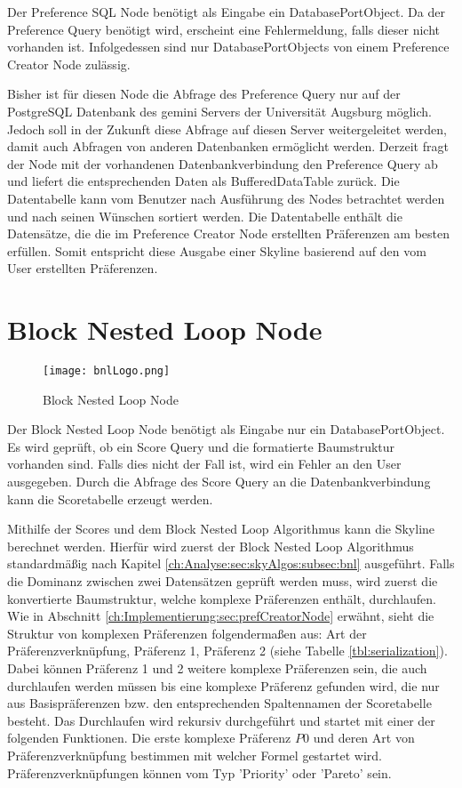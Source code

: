 Der Preference SQL Node benötigt als Eingabe ein DatabasePortObject. Da der Preference Query benötigt wird, erscheint eine Fehlermeldung, falls dieser nicht vorhanden ist. Infolgedessen sind nur DatabasePortObjects von einem Preference Creator Node zulässig.

Bisher ist für diesen Node die Abfrage des Preference Query nur auf der PostgreSQL Datenbank des gemini Servers der Universität Augsburg möglich. Jedoch soll in der Zukunft diese Abfrage auf diesen Server weitergeleitet werden, damit auch Abfragen von anderen Datenbanken ermöglicht werden.
Derzeit fragt der Node mit der vorhandenen Datenbankverbindung den Preference Query ab und liefert die entsprechenden Daten als BufferedDataTable zurück. Die Datentabelle kann vom Benutzer nach Ausführung des Nodes betrachtet werden und nach seinen Wünschen sortiert werden. Die Datentabelle enthält die Datensätze, die die im Preference Creator Node erstellten Präferenzen am besten erfüllen. Somit entspricht diese Ausgabe einer Skyline basierend auf den vom User erstellten Präferenzen.
\section{Block Nested Loop Node}
\label{ch:Implementierung:sec:bnlNode}
\begin{figure}[H]
	\centering
	\texttt{[image: bnlLogo.png]}
	\caption{Block Nested Loop Node}
	\label{img:bnlLogo}
\end{figure}

Der Block Nested Loop Node benötigt als Eingabe nur ein DatabasePortObject. Es wird geprüft, ob ein Score Query und die formatierte Baumstruktur vorhanden sind. Falls dies nicht der Fall ist, wird ein Fehler an den User ausgegeben.
Durch die Abfrage des Score Query an die Datenbankverbindung kann die Scoretabelle erzeugt werden.

Mithilfe der Scores und dem Block Nested Loop Algorithmus kann die Skyline berechnet werden.
Hierfür wird zuerst der Block Nested Loop Algorithmus standardmäßig nach Kapitel \ref{ch:Analyse:sec:skyAlgos:subsec:bnl} ausgeführt. Falls die Dominanz zwischen zwei Datensätzen geprüft werden muss, wird zuerst die konvertierte Baumstruktur, welche komplexe Präferenzen enthält, durchlaufen.
Wie in Abschnitt \ref{ch:Implementierung:sec:prefCreatorNode} erwähnt, sieht die Struktur von komplexen Präferenzen folgendermaßen aus: Art der Präferenzverknüpfung, Präferenz 1, Präferenz 2 (siehe Tabelle \ref{tbl:serialization}).
Dabei können Präferenz 1 und 2 weitere komplexe Präferenzen sein, die auch durchlaufen werden müssen bis eine komplexe Präferenz gefunden wird, die nur aus Basispräferenzen bzw. den entsprechenden Spaltennamen der Scoretabelle besteht.
Das Durchlaufen wird rekursiv durchgeführt und startet mit einer der folgenden Funktionen. Die erste komplexe Präferenz $P0$ und deren Art von Präferenzverknüpfung bestimmen mit welcher Formel gestartet wird.
Präferenzverknüpfungen können vom Typ 'Priority' oder 'Pareto' sein.

